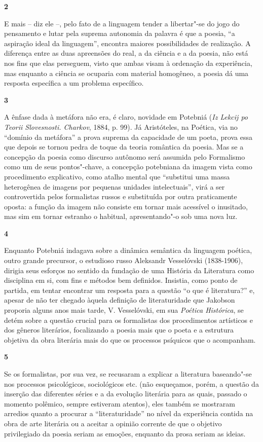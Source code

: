\textbf{2}

E mais -- diz ele --, pelo fato de a linguagem tender a libertar"-se do
jogo do pensamento e lutar pela suprema autonomia da palavra é que a
poesia, ``a aspiração ideal da linguagem'', encontra maiores
possibilidades de realização. A diferença entre as duas apreensões do
real, a da ciência e a da poesia, não está nos fins que elas perseguem,
visto que ambas visam à ordenação da experiência, mas enquanto a ciência
se ocuparia com material homogêneo, a poesia dá uma resposta específica
a um problema específico.

\textbf{3}

A ênfase dada à metáfora não era, é claro, novidade em Potebniá
(\emph{Iz Lekcij po Teorii Slovesnosti. Charkov}, 1884, p. 99). Já
Aristóteles, na Poética, via no ``domínio da metáfora'' a prova suprema
da capacidade de um poeta, prova essa que depois se tornou pedra de
toque da teoria romântica da poesia. Mas se a concepção da poesia como
discurso autônomo será assumida pelo Formalismo como um de seus
pontos"-chave, a concepção potebniana da imagem vista como procedimento
explicativo, como atalho mental que ``substitui uma massa heterogênea de
imagens por pequenas unidades intelectuais'', virá a ser controvertida
pelos formalistas russos e substituída por outra praticamente oposta: a
função da imagem não consiste em tornar mais acessível o inusitado, mas
sim em tornar estranho o habitual, apresentando"-o sob uma nova luz.

\textbf{4}

Enquanto Potebniá indagava sobre a dinâmica semântica da linguagem
poética, outro grande precursor, o estudioso russo Aleksandr Vesselóvski
(1838-1906), dirigia seus esforços no sentido da fundação de uma
História da Literatura como disciplina em si, com fins e métodos bem
definidos. Insistia, como ponto de partida, em tentar encontrar um
resposta para a questão ``o que é literatura?'' e, apesar de não ter
chegado àquela definição de literaturidade que Jakobson proporia alguns
anos mais tarde, V. Vesselóvski, em sua \emph{Poética Histórica}, se
detém sobre a questão crucial para os formalistas dos procedimentos
artísticos e dos gêneros literários, focalizando a poesia mais que o
poeta e a estrutura objetiva da obra literária mais do que os processos
psíquicos que o acompanham.

\textbf{5}

Se os formalistas, por sua vez, se recusaram a explicar a literatura
baseando"-se nos processos psicológicos, sociológicos etc. (não
esqueçamos, porém, a questão da inserção das diferentes séries e a da
evolução literária para as quais, passado o momento polêmico, sempre
estiveram atentos), eles também se mostraram arredios quanto a procurar
a ``literaturidade'' no nível da experiência contida na obra de arte
literária ou a aceitar a opinião corrente de que o objetivo privilegiado
da poesia seriam as emoções, enquanto da prosa seriam as ideias.

